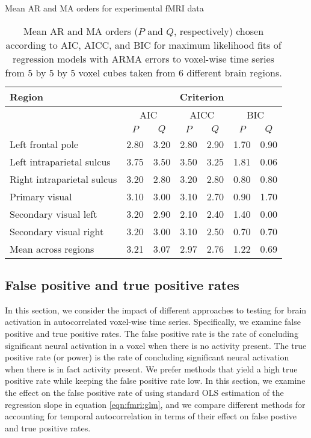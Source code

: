 \begin{table}
\ssp
\centering
\caption{Mean AR and MA orders for experimental fMRI data} \label{tab:fmri:arma}
\begin{tabular}{|l|cc|cc|cc|}
\hline
Region & \multicolumn{6}{|c|}{Criterion} \\
\hline
 & \multicolumn{2}{|c|}{AIC} & \multicolumn{2}{|c|}{AICC} & \multicolumn{2}{|c|}{BIC} \\
\hline
 & $P$ & $Q$ & $P$ & $Q$ & $P$ & $Q$ \\
\hline
Left frontal pole          & 2.80 & 3.20 & 2.80 & 2.90 & 1.70 & 0.90 \\
Left intraparietal sulcus  & 3.75 & 3.50 & 3.50 & 3.25 & 1.81 & 0.06 \\
Right intraparietal sulcus & 3.20 & 2.80 & 3.20 & 2.80 & 0.80 & 0.80 \\
Primary visual             & 3.10 & 3.00 & 3.10 & 2.70 & 0.90 & 1.70 \\
Secondary visual left      & 3.20 & 2.90 & 2.10 & 2.40 & 1.40 & 0.00 \\
Secondary visual right     & 3.20 & 3.00 & 3.10 & 2.50 & 0.70 & 0.70 \\
\hline
Mean across regions     & 3.21 & 3.07 & 2.97 & 2.76 & 1.22 & 0.69 \\
\hline
\end{tabular}
\caption*{Mean AR and MA orders ($P$ and $Q$, respectively) chosen according to AIC, AICC, and BIC for maximum likelihood fits of regression models with ARMA errors to voxel-wise time series from 5 by 5 by 5 voxel cubes taken from 6 different brain regions.}
\end{table}

\subsection{False positive and true positive rates \label{sec:fmri:fpr}}

In this section, we consider the impact of different approaches to testing for brain activation in autocorrelated voxel-wise time series. Specifically, we examine false positive and true positive rates. The false positive rate is the rate of concluding significant neural activation in a voxel when there is no activity present. The true positive rate (or power) is the rate of concluding significant neural activation when there is in fact activity present. We prefer methods that yield a high true positive rate while keeping the false positive rate low. In this section, we examine the effect on the false positive rate of using standard OLS estimation of the regression slope in equation \eqref{eqn:fmri:glm}, and we compare different methods for accounting for temporal autocorrelation in terms of their effect on false postive and true positive rates.

